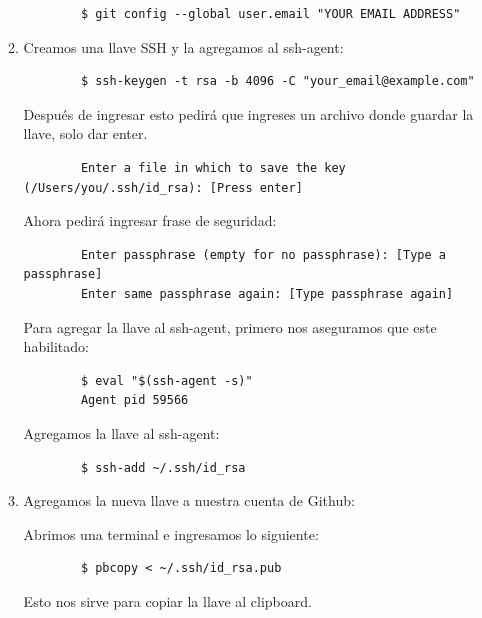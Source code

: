 \documentclass{article}
\begin{document}
\begin{itemize}
\begin{enumerate}
\begin{verbatim}
        $ git config --global user.email "YOUR EMAIL ADDRESS"
      \end{verbatim}

      \item Creamos una llave SSH y la agregamos al ssh-agent:
      \begin{verbatim}
        $ ssh-keygen -t rsa -b 4096 -C "your_email@example.com"
      \end{verbatim}
      Después de ingresar esto pedirá que ingreses un archivo donde guardar la llave, solo dar enter.
      \begin{verbatim}
        Enter a file in which to save the key (/Users/you/.ssh/id_rsa): [Press enter]
      \end{verbatim}
      Ahora pedirá ingresar frase de seguridad:
      \begin{verbatim}
        Enter passphrase (empty for no passphrase): [Type a passphrase]
        Enter same passphrase again: [Type passphrase again]
      \end{verbatim}
      Para agregar la llave al ssh-agent, primero nos aseguramos que este habilitado:
      \begin{verbatim}
        $ eval "$(ssh-agent -s)"
        Agent pid 59566
      \end{verbatim}
      Agregamos la llave al ssh-agent:
      \begin{verbatim}
        $ ssh-add ~/.ssh/id_rsa
      \end{verbatim}

      \item Agregamos la nueva llave a nuestra cuenta de Github:

      Abrimos una terminal e ingresamos lo siguiente:
      \begin{verbatim}
        $ pbcopy < ~/.ssh/id_rsa.pub
      \end{verbatim}
      Esto nos sirve para copiar la llave al clipboard.\\


\end{enumerate}
\end{itemize}
\end{document}
